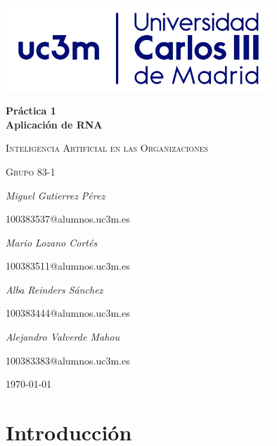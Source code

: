 \documentclass[12pt,a4paper, xcolor=table]{article}
\begin{document}
\setlength{\parindent}{0pt}
\begin{titlepage}
        \centering
        \includegraphics[width=0.75\textwidth]{img/logo_uc3m.jpg}\par\vspace{3cm}
        {\huge\bfseries Práctica 1 \\ Aplicación de RNA\par}
        \vspace{0.5cm}
        {\scshape\Large Inteligencia Artificial en las Organizaciones\par}
        \vspace{1.5cm}
        {\scshape\Large Grupo 83-1\par}
        \vspace{1.5cm}
        {\Large\itshape Miguel Gutierrez Pérez\par}
        {\Large 100383537@alumnos.uc3m.es \par}
        \vspace{1cm}
        {\Large\itshape Mario Lozano Cortés\par}
        {\Large 100383511@alumnos.uc3m.es\par}
        \vspace{1cm}
        {\Large\itshape Alba Reinders Sánchez\par}
        {\Large 100383444@alumnos.uc3m.es\par}
        \vspace{1cm}
        {\Large\itshape Alejandro Valverde Mahou\par}
        {\Large 100383383@alumnos.uc3m.es\par}
        \vfill

        {\large \today\par}
\end{titlepage}

\tableofcontents

\newpage

\section{Introducción}
\end{document}
